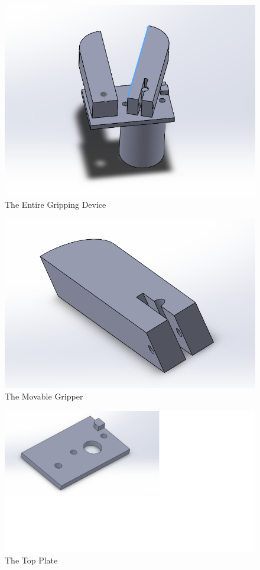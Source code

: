 \documentclass[letterpaper, 10 pt, conference]{ieeeconf}  %
\begin{document}
\begin{figure}[!htb]
	\includegraphics[width=\linewidth]{assembly.png}
	\caption{The Entire Gripping Device}
	\label{fig:assembly}
\end{figure}
\FloatBarrier

\begin{figure}[!htb]
	\includegraphics[width=\linewidth]{gripper.png}
	\caption{The Movable Gripper}
	\label{fig:gripper}
\end{figure}
\FloatBarrier

\begin{figure}[!htb]
	\centering
	\includegraphics[width=\linewidth]{top_plate.png}
	\caption{The Top Plate}
	\label{fig:top_plate}
\end{figure}
\FloatBarrier
\end{document}
